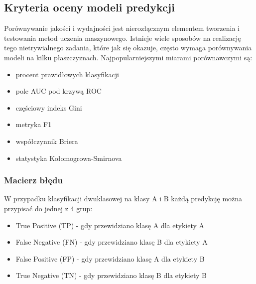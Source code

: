 \documentclass[a4paper, twoside, 11pt, openright]{article}
\begin{document}




\subsection{Kryteria oceny modeli predykcji}

Porównywanie jakości i wydajności jest nierozłącznym elementem tworzenia i testowania metod uczenia maszynowego. Istnieje wiele sposobów na realizację tego nietrywialnego zadania, które jak się okazuje, często wymaga porównywania modeli na kilku płaszczyznach. Najpopularniejszymi miarami porównawczymi są:
\begin{itemize}
\item procent prawidłowych klasyfikacji
\item pole AUC pod krzywą ROC
\item częściowy indeks Gini
\item metryka F1
\item współczynnik Briera
\item statystyka Kołomogrowa-Smirnova
\end{itemize}

\subsubsection{Macierz błędu}

W przypadku klasyfikacji dwuklasowej na klasy A i B każdą predykcję można przypisać do jednej z 4 grup:
\begin{itemize}
\item True Positive (TP) - gdy przewidziano klasę A dla etykiety A
\item False Negative (FN) - gdy przewidziano klasę B dla etykiety A
\item False Positive (FP) - gdy przewidziano klasę A dla etykiety B
\item True Negative (TN) - gdy przewidziano klasę B dla etykiety B
\end{itemize}
\end{document}
